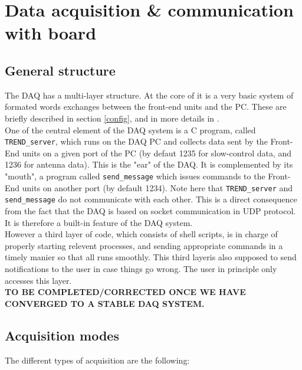 \section{Data acquisition \& communication with board} 
\label{DAQ}

\subsection{General structure}
The DAQ has a multi-layer structure. At the core of it is a very basic system of formated words exchanges between the front-end units and the PC. These are briefly described in section \ref{config}, and in more details in \cite{GP35daq}. \\
%
One of the central element of the DAQ system is a C program, called \texttt{TREND\_server}, which  runs on the DAQ PC and collects data sent by the Front-End units on a given port of the PC (by defaut 1235 for slow-control data, and 1236 for antenna data). This is the "ear" of the DAQ. It is complemented by its "mouth", a program called \texttt{send\_message} which issues commands to the Front-End units on another port (by default 1234).  Note here that \texttt{TREND\_server} and \texttt{send\_message} do not communicate with each other. This is a direct consequence from the fact that the DAQ is based on socket communication in UDP protocol. It is therefore a built-in feature of the DAQ system. \\
%
However a third layer of code, which consists of shell scripts, is in charge of properly starting relevent processes, and sending appropriate commands in a timely manier so that all runs smoothly. This third layeris also supposed to send notifications to the user in case things go wrong. The user in principle only accesses this layer.  \\

{\bf TO BE COMPLETED/CORRECTED ONCE WE HAVE CONVERGED TO A STABLE DAQ SYSTEM.}

\subsection{Acquisition modes}
The different types of acquisition are the following:

